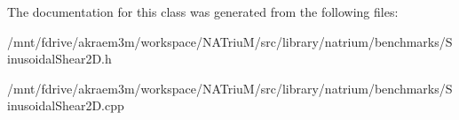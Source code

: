The documentation for this class was generated from the following files:\begin{DoxyCompactItemize}
\item 
/mnt/fdrive/akraem3m/workspace/NATriuM/src/library/natrium/benchmarks/SinusoidalShear2D.h\item 
/mnt/fdrive/akraem3m/workspace/NATriuM/src/library/natrium/benchmarks/SinusoidalShear2D.cpp\end{DoxyCompactItemize}
